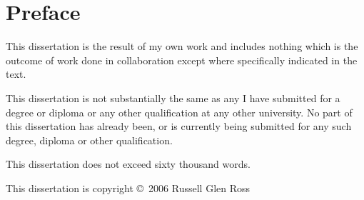 
\chapter*{Preface}

{
\parskip 10pt

\noindent This dissertation is the result of my own work and includes nothing which is the outcome of work done in collaboration except where specifically indicated in the text.

\noindent This dissertation is not substantially the same as any I have submitted for a degree or diploma or any other qualification at any other university. No part of this dissertation has already been, or is currently being submitted for any such degree, diploma or other qualification.

\noindent This dissertation does not exceed sixty thousand words.
}
\vfill

\noindent This dissertation is copyright \copyright~2006 Russell Glen Ross
